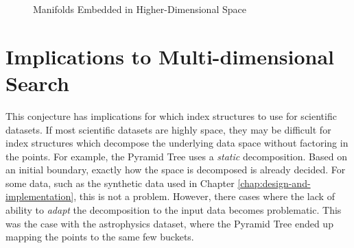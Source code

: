 \begin{figure}
	\caption{Manifolds Embedded in Higher-Dimensional Space}
	\label{fig:manifolds}
\end{figure}

\section{Implications to Multi-dimensional Search}

This conjecture has implications for which index structures to use for scientific datasets. If most scientific datasets are highly space, they may be difficult for index structures which decompose the underlying data space without factoring in the points. For example, the Pyramid Tree uses a \textit{static} decomposition. Based on an initial boundary, exactly how the space is decomposed is already decided. For some data, such as the synthetic data used in Chapter \ref{chap:design-and-implementation}, this is not a problem. However, there cases where the lack of ability to \textit{adapt} the decomposition to the input data becomes problematic. This was the case with the astrophysics dataset, where the Pyramid Tree ended up mapping the points to the same few buckets.

